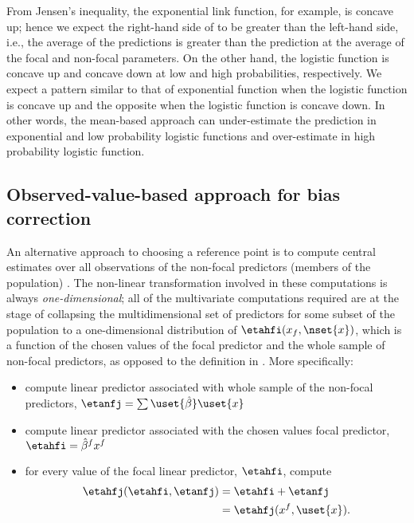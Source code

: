 From Jensen's inequality, the exponential link function, for example, is concave up; hence we expect the right-hand side of  to be greater than the left-hand side, i.e., the average of the predictions is greater than the prediction at the average of the focal and non-focal parameters. On the other hand, the logistic function is concave up and concave down at low and high probabilities, respectively. We expect a pattern similar to that of exponential function when the logistic function is concave up and the opposite when the logistic function is concave down. In other words, the mean-based approach can under-estimate the prediction in exponential and low probability logistic functions and over-estimate in high probability logistic function.

\subsection{Observed-value-based approach for bias correction}

An alternative approach to choosing a reference point is to compute central estimates over all observations of the non-focal predictors (members of the population) \citep{hanmer2013behind}. The non-linear transformation involved in these computations is always \emph{one-dimensional}; all of the multivariate computations required are at the stage of collapsing the multidimensional set of predictors for some subset of the population to a one-dimensional distribution of $\etahfi(x_f, \nset{x})$, which is a function of the chosen values of the focal predictor and the whole sample of non-focal predictors, as opposed to the definition in . More specifically:
\begin{itemize}
\item compute linear predictor associated with whole sample of the non-focal predictors, $\etanfj = \sum \uset{\hat{\beta}} \uset{x}$
\item compute linear predictor associated with the chosen values focal predictor, $\etahfi = \hat{\beta}^f x^f$
\item for every value of the focal linear predictor, $\etahfi$, compute
%
\begin{align}\label{eq:pop_eta} 
\etahfj(\etahfi, \etanfj)  &= \etahfi + \etanfj \nonumber \\
&= \etahfj(x^f, \uset{x}).
\end{align}
\end{itemize}
%

